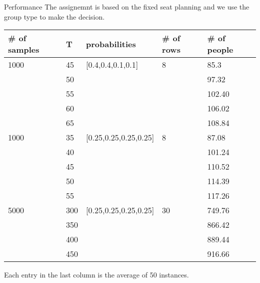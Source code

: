   \begin{frame}{Performance}
    The assignemnt is based on the fixed seat planning and we use the group type to make the decision. 
    \scriptsize
    \begin{table}[ht]
        \begin{tabular}{|l|l|l|l|l|}
        \hline
        \# of samples & T & probabilities & \# of rows & \# of people \\
        \hline
        1000  & 45  & [0.4,0.4,0.1,0.1] & 8  & 85.3 \\
          & 50  &  &   & 97.32 \\
          & 55  &  &   & 102.40  \\ %
          & 60  &  &   & 106.02  \\
         & 65  &  &   & 108.84 \\
        \hline
        1000  & 35  & [0.25,0.25,0.25,0.25] & 8  & 87.08 \\
          & 40  &  &   & 101.24 \\
          & 45  &  &   & 110.52 \\
          & 50  &  &   & 114.39 \\
          & 55  &  &   & 117.26 \\
        \hline
        5000  & 300  & [0.25,0.25,0.25,0.25] & 30  & 749.76 \\
         & 350  &  &   & 866.42 \\
          & 400  &  &   & 889.44 \\
          & 450  &  &   & 916.66 \\
        \hline
        \end{tabular}
    \end{table}
  
  Each entry in the last column is the average of 50 instances.
  \end{frame}

